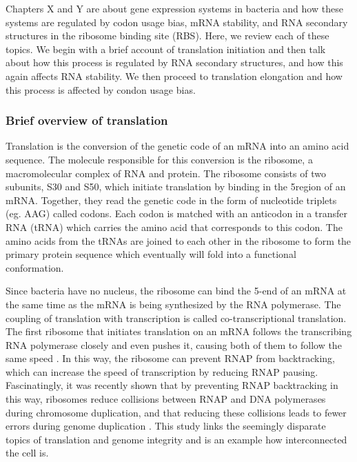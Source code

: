 %
Chapters X and Y are about gene expression systems in bacteria and how these
systems are regulated by codon usage bias, mRNA stability, and RNA secondary
structures in the ribosome binding site (RBS). Here, we review each of these
topics. We begin with a brief account of translation initiation and then talk
about how this process is regulated by RNA secondary structures, and how this
again affects RNA stability. We then proceed to translation elongation and how
this process is affected by condon usage bias.

\subsubsection{Brief overview of translation}
Translation is the conversion of the genetic code of an mRNA into an amino acid
sequence. The molecule responsible for this conversion is the ribosome, a
macromolecular complex of RNA and protein. The ribosome consists of two
subunits, S30 and S50, which initiate translation by binding in the 5\p region
of an mRNA. Together, they read the genetic code in the form of nucleotide
triplets (eg. AAG) called codons. Each codon is matched with an anticodon in a
transfer RNA (tRNA) which carries the amino acid that corresponds to this
codon. The amino acids from the tRNAs are joined to each other in the ribosome
to form the primary protein sequence which eventually will fold into a
functional conformation.

Since bacteria have no nucleus, the ribosome can bind the 5\p-end of an mRNA at
the same time as the mRNA is being synthesized by the RNA polymerase. The
coupling of translation with transcription is called co-transcriptional
translation. The first ribosome that initiates translation on an mRNA follows
the transcribing RNA polymerase closely and even pushes it, causing both of
them to follow the same speed \cite{proshkin_cooperation_2010}. In this way,
the ribosome can prevent RNAP from backtracking, which can increase the speed
of transcription by reducing RNAP pausing. Fascinatingly, it was recently shown
that by preventing RNAP backtracking in this way, ribosomes reduce collisions
between RNAP and DNA polymerases during chromosome duplication, and that
reducing these collisions leads to fewer errors during genome duplication
\cite{dutta_linking_2011}. This study links the seemingly disparate topics of
translation and genome integrity and is an example how interconnected the cell
is.

